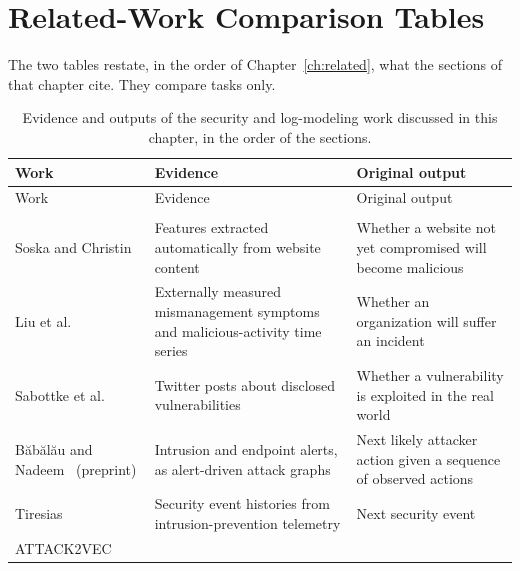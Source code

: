 \chapter{Related-Work Comparison Tables}
\label{app:related-tables}

The two tables restate, in the order of Chapter~\ref{ch:related}, what
the sections of that chapter cite. They compare tasks only.

{\small{}%
\begin{xltabular}{\textwidth}{@{}>{\raggedright\arraybackslash}p{0.22\textwidth}>{\raggedright\arraybackslash}X>{\raggedright\arraybackslash}X@{}}
\caption[Evidence and outputs of the security and log-modeling work]{Evidence and outputs of the security and log-modeling work
discussed in this chapter, in the order of the sections.}
\label{tab:related-tasks}\\
\toprule
Work & Evidence & Original output \\
\midrule
\endfirsthead
\toprule
Work & Evidence & Original output \\
\midrule
\endhead
\bottomrule
\endlastfoot
{} \\
Soska and Christin~\cite{soska2014automatically}
 & Features extracted automatically from website content
 & Whether a website not yet compromised will become malicious \\
Liu et al.~\cite{liu2015cloudy}
 & Externally measured mismanagement symptoms and malicious-activity time series
 & Whether an organization will suffer an incident \\
Sabottke et al.~\cite{sabottke2015vulnerability}
 & Twitter posts about disclosed vulnerabilities
 & Whether a vulnerability is exploited in the real world \\
B\u{a}b\u{a}l\u{a}u and Nadeem~\cite{babalau2024forecasting} (preprint)
 & Intrusion and endpoint alerts, as alert-driven attack graphs
 & Next likely attacker action given a sequence of observed actions \\
Tiresias~\cite{shen2018tiresias}
 & Security event histories from intrusion-prevention telemetry
 & Next security event \\
ATTACK2VEC~\cite{shen2019attack2vec}

\end{xltabular}}
